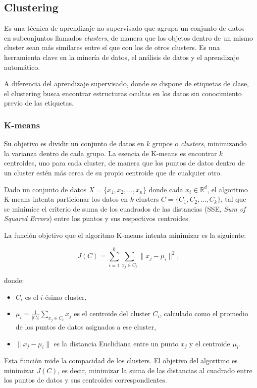\subsection{Clustering}
Es una técnica de aprendizaje no supervisado que agrupa un conjunto de datos en subconjuntos llamados \textit{clusters}, de manera que los objetos dentro de un mismo cluster sean más similares entre sí que con los de otros clusters. Es una herramienta clave en la minería de datos, el análisis de datos y el aprendizaje automático.

A diferencia del aprendizaje supervisado, donde se dispone de etiquetas de clase, el clustering busca encontrar estructuras ocultas en los datos sin conocimiento previo de las etiquetas.

\subsubsection{K-means}
Su objetivo es dividir un conjunto de datos en \(k\) grupos o \textit{clusters}, minimizando la varianza dentro de cada grupo. La esencia de K-means es encontrar \(k\) centroides, uno para cada cluster, de manera que los puntos de datos dentro de un cluster estén más cerca de su propio centroide que de cualquier otro.

Dado un conjunto de datos \(X = \{x_1, x_2, \dots, x_n\}\) donde cada \(x_i \in \mathbb{R}^d\), el algoritmo K-means intenta particionar los datos en \(k\) clusters \(C = \{C_1, C_2, \dots, C_k\}\), tal que se minimice el criterio de suma de los cuadrados de las distancias (SSE, \textit{Sum of Squared Errors}) entre los puntos y sus respectivos centroides.

La función objetivo que el algoritmo K-means intenta minimizar es la siguiente:

\[
J(C) = \sum_{i=1}^{k} \sum_{x_j \in C_i} \| x_j - \mu_i \|^2,
\]

donde:
\begin{itemize}
    \item \(C_i\) es el \(i\)-ésimo cluster,
    \item \(\mu_i = \frac{1}{|C_i|} \sum_{x_j \in C_i} x_j\) es el centroide del cluster \(C_i\), calculado como el promedio de los puntos de datos asignados a ese cluster,
    \item \(\| x_j - \mu_i \|\) es la distancia Euclidiana entre un punto \(x_j\) y el centroide \(\mu_i\).
\end{itemize}

Esta función mide la compacidad de los clusters. El objetivo del algoritmo es minimizar \(J(C)\), es decir, minimizar la suma de las distancias al cuadrado entre los puntos de datos y sus centroides correspondientes.

